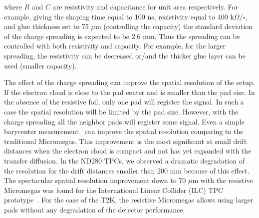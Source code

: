 \documentclass[../main.tex]{subfiles}
\begin{document}
where $R$ and $C$ are resistivity and capacitance for unit area respectively. For example, giving the shaping time equal to 100 ns, resistivity equal to 400 $\text{k}\Omega/\square$, and glue thickness set to 75 $\mu\text{m}$ (controlling the capacity) the standard deviation of the charge spreading is expected to be 2.6 mm. Thus the spreading can be controlled with both resistivity and capacity. For example, for the larger spreading, the resistivity can be decreased or/and the thicker glue layer can be used (smaller capacity).

The effect of the charge spreading can improve the spatial resolution of the setup. If the electron cloud is close to the pad center and is smaller than the pad size. In the absence of the resistive foil, only one pad will register the signal. In such a case the spatial resolution will be limited by the pad size. However, with the charge spreading all the neighbor pads will register some signal. Even a simple barycenter measurement~\cite{Dixit2004} can improve the spatial resolution comparing to the traditional Micromegas. This improvement is the most significant at small drift distances when the electron cloud is compact and not has yet expanded with the transfer diffusion. In the ND280 TPCs, we observed a dramatic degradation of the resolution for the drift distances smaller than 200 mm because of this effect. The spectacular spatial resolution improvement down to 70 $\mu\text{m}$ with the resistive Micromegas was found for the International Linear Collider (ILC) TPC prototype~\cite{Attie2011}. For the case of the T2K, the resistive Micromegas allows using larger pads without any degradation of the detector performance.
\end{document}

